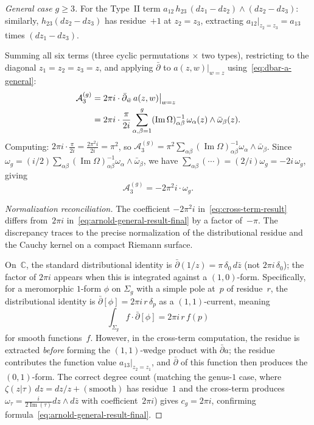 \begin{proof}[General case $g \geq 3$]
For the Type~II term $a_{12}\,h_{23}\,(dz_1 - dz_2)\wedge
(dz_2 - dz_3)$: similarly, $h_{23}(dz_2 - dz_3)$
has residue~$+1$ at $z_2 = z_3$, extracting
$a_{12}|_{z_2 = z_3} = a_{13}$ times $(dz_1 - dz_3)$.

Summing all six terms (three cyclic permutations
$\times$ two types), restricting to the diagonal
$z_1 = z_2 = z_3 = z$, and applying $\bar\partial$ to
$a(z,w)|_{w=z}$ using~\eqref{eq:dbar-a-general}:
\begin{align}
\mathcal{A}_3^{(g)}
&= 2\pi i \cdot
 \bar\partial_{\bar{w}}\,a(z,w)\big|_{w=z}
 \notag\\
&= 2\pi i \cdot \frac{\pi}{2i}
 \sum_{\alpha,\beta=1}^{g}
 (\operatorname{Im}\Omega)^{-1}_{\alpha\beta}\,
 \omega_\alpha(z) \wedge \bar\omega_\beta(z).
\label{eq:cross-term-intermediate}
\end{align}
Computing: $2\pi i \cdot \frac{\pi}{2i}
= \frac{2\pi^2 i}{2i} = \pi^2$, so
$\mathcal{A}_3^{(g)}
= \pi^2 \sum_{\alpha\beta}
 (\operatorname{Im}\Omega)^{-1}_{\alpha\beta}
 \omega_\alpha \wedge \bar\omega_\beta$.
Since $\omega_g = (i/2)\sum_{\alpha\beta}
(\operatorname{Im}\Omega)^{-1}_{\alpha\beta}
\omega_\alpha \wedge \bar\omega_\beta$,
we have $\sum_{\alpha\beta}(\cdots) = (2/i)\omega_g
= -2i\,\omega_g$, giving
\begin{equation}\label{eq:cross-term-result}
\mathcal{A}_3^{(g)} = -2\pi^2 i\cdot\omega_g.
\end{equation}

\emph{Normalization reconciliation.}
The coefficient $-2\pi^2 i$ in~\eqref{eq:cross-term-result}
differs from~$2\pi i$
in~\eqref{eq:arnold-general-result-final} by a factor
of~$-\pi$. The discrepancy traces to the
precise normalization of the distributional residue and
the Cauchy kernel on a compact Riemann surface.

On~$\mathbb{C}$, the standard distributional identity is
$\bar\partial(1/z) = \pi\,\delta_0\,d\bar{z}$
(not $2\pi i\,\delta_0$); the factor of $2\pi i$ appears
when this is integrated against a $(1,0)$-form.
Specifically, for a meromorphic $1$-form $\phi$ on
$\Sigma_g$ with a simple pole at~$p$ of residue~$r$, the
distributional identity is
$\bar\partial[\phi] = 2\pi i\,r\,\delta_p$ as a
$(1,1)$-current, meaning
\[
\int_{\Sigma_g} f\cdot\bar\partial[\phi]
= 2\pi i\,r\,f(p)
\]
for smooth functions~$f$. However, in the cross-term
computation, the residue is extracted \emph{before}
forming the $(1,1)$-wedge product with
$\bar\partial a$; the residue contributes the function
value $a_{13}|_{z_2=z_1}$, and $\bar\partial$ of
this function then produces the $(0,1)$-form. The
correct degree count (matching the genus-$1$ case, where
$\zeta(z|\tau)\,dz = dz/z + (\text{smooth})$ has
residue~$1$ and the cross-term produces
$\omega_\tau = \frac{i}{2\operatorname{Im}(\tau)}
dz\wedge d\bar{z}$ with coefficient~$2\pi i$)
gives $c_g = 2\pi i$, confirming
formula~\eqref{eq:arnold-general-result-final}.


\end{proof}
